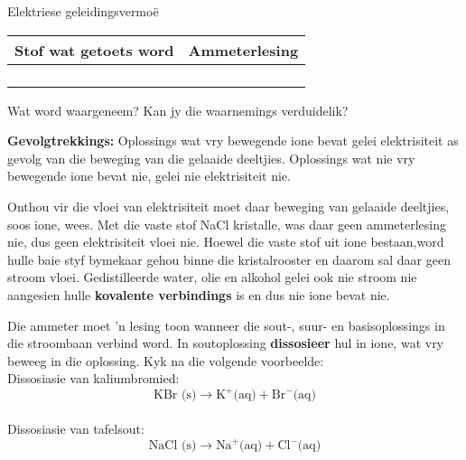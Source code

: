 \begin{g_experiment}{Elektriese geleidingsvermo\"{e}}
\begin{table}[H]
\begin{center}
    \noindent
      \begin{tabular}{|l|l|}\hline
        Stof wat getoets word &
        Ammeterlesing \\ \hline
         &
       \\ \hline
         &
       \\ \hline
         &
       \\ \hline
         &
    \\ \hline
    \end{tabular}
      \end{center}
\end{table}
    \par
  \par 
        \label{m38720*id339669}Wat word waargeneem?  Kan jy die waarnemings verduidelik?\par 
        \label{m38720*id339864}\noindent{}\textbf{Gevolgtrekkings:}
          \newline
Oplossings wat vry bewegende ione bevat gelei elektrisiteit as gevolg van die beweging van die gelaaide deeltjies. Oplossings wat nie vry bewegende ione bevat nie, gelei nie elektrisiteit nie.
\end{g_experiment}
Onthou vir die vloei van elektrisiteit moet daar beweging van gelaaide deeltjies, soos ione, wees. Met die vaste stof NaCl kristalle, was daar geen ammeterlesing nie, dus geen elektrisiteit vloei nie. Hoewel die vaste stof uit ione bestaan,word hulle baie styf bymekaar gehou binne die kristalrooster en daarom sal daar geen stroom vloei. Gedistilleerde water, olie en alkohol gelei ook nie stroom nie aangesien hulle \textbf{kovalente verbindings} is en dus nie ione bevat nie.\par 
Die ammeter moet  'n lesing toon wanneer die sout-, suur- en basisoplossings in die stroombaan verbind word.  In soutoplossing \textbf{dissosieer} hul in ione, wat vry beweeg in die oplossing. Kyk na die volgende voorbeelde:\\
Dissosiasie van kaliumbromied:\\
        \label{m38720*id339701}\nopagebreak\noindent        
    \begin{equation*}
    \text{KBr (s)} \to {\text{K}}^{+} \text{(aq)} + {\text{Br}}^{-} \text{(aq)}
      \end{equation*} \\
Dissosiasie van tafelsout:\\
        \label{m38720*id339737}\nopagebreak\noindent          
    \begin{equation*}
    \text{NaCl (s)}\to {\text{Na}}^{+} \text{(aq)} + {\text{Cl}}^{-} \text{(aq)}
      \end{equation*}\\
